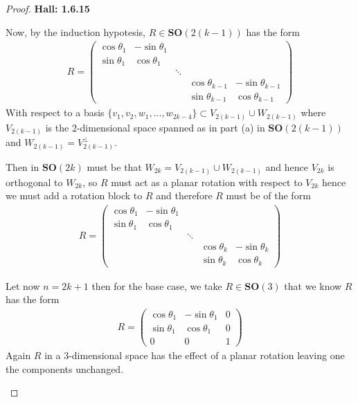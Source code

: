 \documentclass[11pt]{article}
\theoremstyle{definition}
\begin{document}
\begin{proof}{\textbf{Hall: 1.6.15}}
\begin{itemize}
    Now, by the induction hypotesis, $R\in \bm{SO}(2(k - 1))$ has
    the form
    \begin{align*}
        R = \begin{pmatrix}
            \cos\theta_1 & -\sin\theta_1 &        &                  & \\
            \sin\theta_1 & \cos\theta_1  &        &                  & \\
                         &               & \ddots &                  & \\
                         &               &        & \cos\theta_{k-1} & -\sin\theta_{k-1}\\
                         &               &        & \sin\theta_{k-1} & \cos\theta_{k-1}
        \end{pmatrix}
    \end{align*}
    With respect to a basis
    $\{v_1, v_2, w_1, ..., w_{2k -4}\} \subset V_{2(k-1)} \cup W_{2(k-1)}$
    where $V_{2(k-1)}$ is the 2-dimensional space spanned as in part (a) in
    $\bm{SO}(2(k-1))$ and $W_{2(k-1)} = V^\perp_{2(k-1)}$.
    
    Then in $\bm{SO}(2k)$ must be that $W_{2k} = V_{2(k-1)} \cup W_{2(k-1)}$
    and hence $V_{2k}$ is orthogonal to $W_{2k}$, so $R$ must act as a planar
    rotation with respect to $V_{2k}$ hence we must add a rotation block to
    $R$ and therefore $R$ must be of the form 
    \begin{align*}
        R = \begin{pmatrix}
            \cos\theta_1 & -\sin\theta_1 &        &                  & \\
            \sin\theta_1 & \cos\theta_1  &        &                  & \\
                         &               & \ddots &                  & \\
                         &               &        & \cos\theta_{k} & -\sin\theta_{k}\\
                         &               &        & \sin\theta_{k} & \cos\theta_{k}
        \end{pmatrix}
    \end{align*}

    Let now $n = 2k +1$ then for the base case, we take $R \in \bm{SO}(3)$ that
    we know $R$ has the form
    \begin{align*}
        R = \begin{pmatrix}
            \cos\theta_1 & -\sin\theta_1 & 0\\
            \sin\theta_1 & \cos\theta_1 & 0\\
            0 & 0 & 1
        \end{pmatrix}
    \end{align*}
    Again $R$ in a 3-dimensional space has the effect of a planar rotation
    leaving one the components unchanged.


\end{itemize}
\end{proof}
\end{document}
